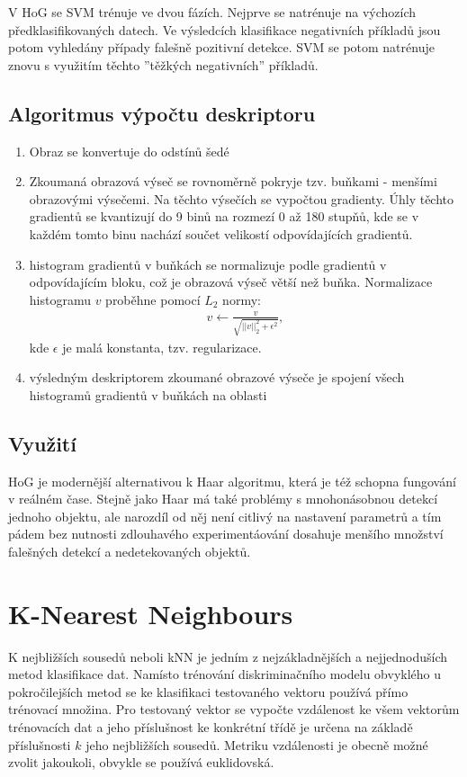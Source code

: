 	V HoG se SVM trénuje ve dvou fázích. Nejprve se natrénuje na výchozích předklasifikovaných datech. Ve výsledcích klasifikace negativních příkladů jsou potom vyhledány případy falešně pozitivní detekce. SVM se potom natrénuje znovu s využitím těchto ''těžkých negativních'' příkladů.
	
	\subsection{Algoritmus výpočtu deskriptoru}
	
	\begin{enumerate}
		\item Obraz se konvertuje do odstínů šedé
		\item Zkoumaná obrazová výseč se rovnoměrně pokryje tzv. buňkami - menšími obrazovými výsečemi. Na těchto výsečích se vypočtou gradienty. Úhly těchto gradientů se kvantizují do 9 binů na rozmezí 0 až 180 stupňů, kde se v každém tomto binu nachází součet velikostí odpovídajících gradientů.
		\item histogram gradientů v buňkách se normalizuje podle gradientů v odpovídajícím bloku, což je obrazová výseč větší než buňka. Normalizace histogramu $v$ proběhne pomocí $L_2$ normy:
		\begin{align}
		v \leftarrow \frac{v}{\sqrt{||v||_2^2 + \epsilon^2}},
		\end{align}
		kde $\epsilon$ je malá konstanta, tzv. regularizace.
		\item výsledným deskriptorem zkoumané obrazové výseče je spojení všech histogramů gradientů v buňkách na oblasti
	\end{enumerate}

	\subsection{Využití}
	
	HoG je modernější alternativou k Haar algoritmu, která je též schopna fungování v reálném čase. Stejně jako Haar má také problémy s mnohonásobnou detekcí jednoho objektu, ale narozdíl od něj není citlivý na nastavení parametrů a tím pádem bez nutnosti zdlouhavého experimentáování dosahuje menšího množství falešných detekcí a nedetekovaných objektů.


\section{K-Nearest Neighbours}

	K nejbližších sousedů neboli kNN je jedním z nejzákladnějších a nejjednoduších metod klasifikace dat. Namísto trénování diskriminačního modelu obvyklého u pokročilejších metod se ke klasifikaci testovaného vektoru používá přímo trénovací množina. Pro testovaný vektor se vypočte vzdálenost ke všem vektorům trénovacích dat a jeho příslušnost ke konkrétní třídě je určena na základě příslušnosti $k$ jeho nejbližších sousedů. Metriku vzdálenosti je obecně možné zvolit jakoukoli, obvykle se používá euklidovská.
	
